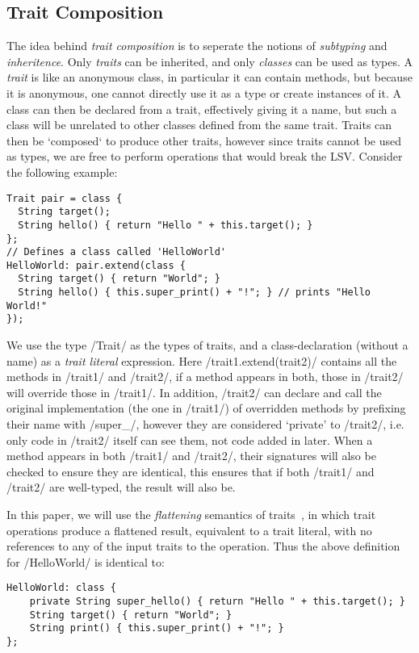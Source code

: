 \subsection{Trait Composition}
The idea behind \emph{trait composition} is to seperate the notions of \emph{subtyping} and \emph{inheritence}. Only \emph{traits} can be inherited, and only \emph{classes} can be used as types. A \emph{trait} is like an anonymous class, in particular it can contain methods, but because it is anonymous, one cannot directly use it as a type or create instances of it. A class can then be declared from a trait, effectively giving it a name, but such a class will be unrelated to other classes defined from the same trait. Traits can then be `composed` to produce other traits, however since traits cannot be used as types, we are free to perform operations that would break the LSV. Consider the following example:
\begin{lstlisting}
Trait pair = class {
  String target();
  String hello() { return "Hello " + this.target(); }
};
// Defines a class called 'HelloWorld'
HelloWorld: pair.extend(class {
  String target() { return "World"; }
  String hello() { this.super_print() + "!"; } // prints "Hello World!"
});
\end{lstlisting}
We use the type /Trait/ as the types of traits, and a class-declaration (without a name) as a \emph{trait literal} expression. Here /trait1.extend(trait2)/ contains all the methods in /trait1/ and /trait2/, if a method appears in both, those in /trait2/ will override those in /trait1/. In addition, /trait2/ can declare and call the original implementation (the one in /trait1/) of overridden methods by prefixing their name with /super_/, however they are considered `private' to /trait2/, i.e. only code in /trait2/ itself can see them, not code added in later. When a method appears in both /trait1/ and /trait2/, their signatures will also be checked to ensure they are identical, this ensures that if both /trait1/ and /trait2/ are well-typed, the result will also be.

In this paper, we will use the \emph{flattening} semantics of traits~\cite{?}, in which trait operations produce a flattened result, equivalent to a trait literal, with no references to any of the input traits to the operation. Thus the above definition for /HelloWorld/ is identical to:
\begin{lstlisting}
HelloWorld: class {
	private String super_hello() { return "Hello " + this.target(); }
	String target() { return "World"; }
	String print() { this.super_print() + "!"; }
};
\end{lstlisting}

